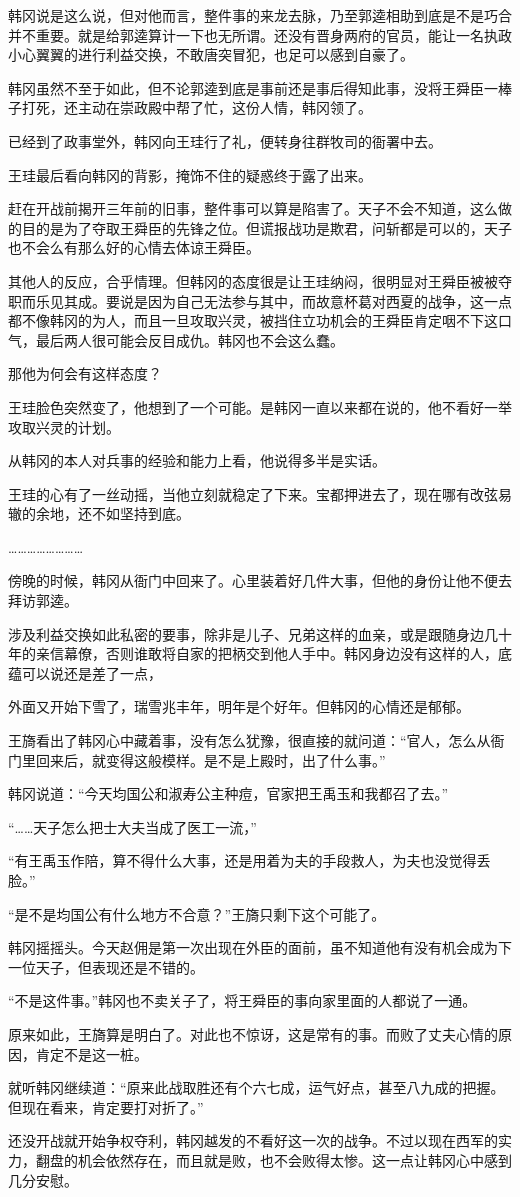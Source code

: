 韩冈说是这么说，但对他而言，整件事的来龙去脉，乃至郭逵相助到底是不是巧合并不重要。就是给郭逵算计一下也无所谓。还没有晋身两府的官员，能让一名执政小心翼翼的进行利益交换，不敢唐突冒犯，也足可以感到自豪了。

韩冈虽然不至于如此，但不论郭逵到底是事前还是事后得知此事，没将王舜臣一棒子打死，还主动在崇政殿中帮了忙，这份人情，韩冈领了。

已经到了政事堂外，韩冈向王珪行了礼，便转身往群牧司的衙署中去。

王珪最后看向韩冈的背影，掩饰不住的疑惑终于露了出来。

赶在开战前揭开三年前的旧事，整件事可以算是陷害了。天子不会不知道，这么做的目的是为了夺取王舜臣的先锋之位。但谎报战功是欺君，问斩都是可以的，天子也不会么有那么好的心情去体谅王舜臣。

其他人的反应，合乎情理。但韩冈的态度很是让王珪纳闷，很明显对王舜臣被被夺职而乐见其成。要说是因为自己无法参与其中，而故意杯葛对西夏的战争，这一点都不像韩冈的为人，而且一旦攻取兴灵，被挡住立功机会的王舜臣肯定咽不下这口气，最后两人很可能会反目成仇。韩冈也不会这么蠢。

那他为何会有这样态度？

王珪脸色突然变了，他想到了一个可能。是韩冈一直以来都在说的，他不看好一举攻取兴灵的计划。

从韩冈的本人对兵事的经验和能力上看，他说得多半是实话。

王珪的心有了一丝动摇，当他立刻就稳定了下来。宝都押进去了，现在哪有改弦易辙的余地，还不如坚持到底。

……………………

傍晚的时候，韩冈从衙门中回来了。心里装着好几件大事，但他的身份让他不便去拜访郭逵。

涉及利益交换如此私密的要事，除非是儿子、兄弟这样的血亲，或是跟随身边几十年的亲信幕僚，否则谁敢将自家的把柄交到他人手中。韩冈身边没有这样的人，底蕴可以说还是差了一点，

外面又开始下雪了，瑞雪兆丰年，明年是个好年。但韩冈的心情还是郁郁。

王旖看出了韩冈心中藏着事，没有怎么犹豫，很直接的就问道：“官人，怎么从衙门里回来后，就变得这般模样。是不是上殿时，出了什么事。”

韩冈说道：“今天均国公和淑寿公主种痘，官家把王禹玉和我都召了去。”

“……天子怎么把士大夫当成了医工一流，”

“有王禹玉作陪，算不得什么大事，还是用着为夫的手段救人，为夫也没觉得丢脸。”

“是不是均国公有什么地方不合意？”王旖只剩下这个可能了。

韩冈摇摇头。今天赵佣是第一次出现在外臣的面前，虽不知道他有没有机会成为下一位天子，但表现还是不错的。

“不是这件事。”韩冈也不卖关子了，将王舜臣的事向家里面的人都说了一通。

原来如此，王旖算是明白了。对此也不惊讶，这是常有的事。而败了丈夫心情的原因，肯定不是这一桩。

就听韩冈继续道：“原来此战取胜还有个六七成，运气好点，甚至八九成的把握。但现在看来，肯定要打对折了。”

还没开战就开始争权夺利，韩冈越发的不看好这一次的战争。不过以现在西军的实力，翻盘的机会依然存在，而且就是败，也不会败得太惨。这一点让韩冈心中感到几分安慰。

